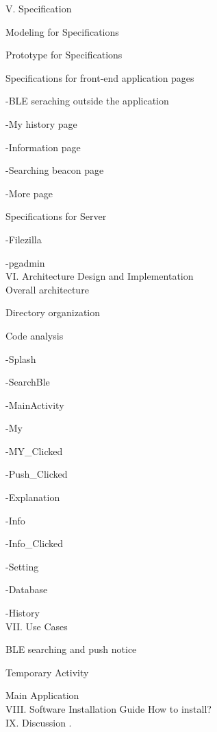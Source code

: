 \documentclass[conference]{IEEEtran}
\begin{document}
V. Specification

 Modeling for Specifications 

 Prototype for Specifications

 Specifications for front-end application pages

\quad\quad-BLE seraching outside the application

\quad\quad-My history page

\quad\quad-Information page

\quad\quad-Searching beacon page

\quad\quad-More page

 Specifications for Server

\quad\quad-Filezilla 

\quad\quad-pgadmin \\

VI. Architecture Design and Implementation\\

 Overall architecture

 Directory organization

 Code analysis

\quad\quad-Splash

\quad\quad-SearchBle

\quad\quad-MainActivity

\quad\quad-My

\quad\quad-MY\_Clicked

\quad\quad-Push\_Clicked

\quad\quad-Explanation

\quad\quad-Info

\quad\quad-Info\_Clicked

\quad\quad-Setting

\quad\quad-Database

\quad\quad-History\\

VII. Use Cases

 BLE searching and push notice

 Temporary Activity

 Main Application\\

VIII. Software Installation Guide
 How to install?\\

IX. Discussion
.
\\\\\\\\\\\\\\\\\\\\\\\\\\\\\\\\\\\\
\end{document}
